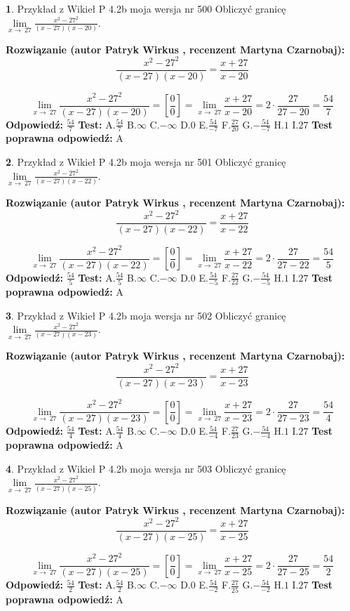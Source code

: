 \documentclass[12pt, a4paper]{article}
\theoremstyle{definition} %
\newtheorem{zad}{}
\newcommand{\zadStart}[1]{\begin{zad}#1\newline}
\newcommand{\zadStop}{\end{zad}}
\newcommand{\rozwStart}[2]{\noindent \textbf{Rozwiązanie (autor #1 , recenzent #2): }\newline}
\newcommand{\rozwStop}{\newline}
\newcommand{\odpStart}{\noindent \textbf{Odpowiedź:}\newline}
\newcommand{\odpStop}{\newline}
\newcommand{\testStart}{\noindent \textbf{Test:}\newline}
\newcommand{\testStop}{\newline}
\newcommand{\kluczStart}{\noindent \textbf{Test poprawna odpowiedź:}\newline}
\newcommand{\kluczStop}{\newline}
\begin{document}
\zadStart{Przykład z Wikieł P 4.2b moja wersja nr 500}
Obliczyć granicę $\lim\limits_{x\to\ 27}\frac{x^{2}-27^{2}}{(x-27)(x-20)}$.
\zadStop
\rozwStart{Patryk Wirkus}{Martyna Czarnobaj}
$$\frac{x^{2}-27^{2}}{(x-27)(x-20)}=\frac{x+27}{x-20}$$

$$\lim\limits_{x\to\ 27}\frac{x^{2}-27^{2}}{(x-27)(x-20)}=[\frac{0}{0}]=\lim\limits_{x\to\ 27}\frac{x+27}{x-20}=2 \cdot \frac{27}{27-20} = \frac{54}{7}$$
\rozwStop
\odpStart
$\frac{54}{7}$
\odpStop
\testStart
A.$\frac{54}{7}$
B.$\infty$
C.$-\infty$
D.$0$
E.$\frac{54}{-7}$
F.$\frac{27}{20}$
G.$-\frac{54}{-7}$
H.$1$
I.$27$
\testStop
\kluczStart
A
\kluczStop



\zadStart{Przykład z Wikieł P 4.2b moja wersja nr 501}
Obliczyć granicę $\lim\limits_{x\to\ 27}\frac{x^{2}-27^{2}}{(x-27)(x-22)}$.
\zadStop
\rozwStart{Patryk Wirkus}{Martyna Czarnobaj}
$$\frac{x^{2}-27^{2}}{(x-27)(x-22)}=\frac{x+27}{x-22}$$

$$\lim\limits_{x\to\ 27}\frac{x^{2}-27^{2}}{(x-27)(x-22)}=[\frac{0}{0}]=\lim\limits_{x\to\ 27}\frac{x+27}{x-22}=2 \cdot \frac{27}{27-22} = \frac{54}{5}$$
\rozwStop
\odpStart
$\frac{54}{5}$
\odpStop
\testStart
A.$\frac{54}{5}$
B.$\infty$
C.$-\infty$
D.$0$
E.$\frac{54}{-5}$
F.$\frac{27}{22}$
G.$-\frac{54}{-5}$
H.$1$
I.$27$
\testStop
\kluczStart
A
\kluczStop



\zadStart{Przykład z Wikieł P 4.2b moja wersja nr 502}
Obliczyć granicę $\lim\limits_{x\to\ 27}\frac{x^{2}-27^{2}}{(x-27)(x-23)}$.
\zadStop
\rozwStart{Patryk Wirkus}{Martyna Czarnobaj}
$$\frac{x^{2}-27^{2}}{(x-27)(x-23)}=\frac{x+27}{x-23}$$

$$\lim\limits_{x\to\ 27}\frac{x^{2}-27^{2}}{(x-27)(x-23)}=[\frac{0}{0}]=\lim\limits_{x\to\ 27}\frac{x+27}{x-23}=2 \cdot \frac{27}{27-23} = \frac{54}{4}$$
\rozwStop
\odpStart
$\frac{54}{4}$
\odpStop
\testStart
A.$\frac{54}{4}$
B.$\infty$
C.$-\infty$
D.$0$
E.$\frac{54}{-4}$
F.$\frac{27}{23}$
G.$-\frac{54}{-4}$
H.$1$
I.$27$
\testStop
\kluczStart
A
\kluczStop



\zadStart{Przykład z Wikieł P 4.2b moja wersja nr 503}
Obliczyć granicę $\lim\limits_{x\to\ 27}\frac{x^{2}-27^{2}}{(x-27)(x-25)}$.
\zadStop
\rozwStart{Patryk Wirkus}{Martyna Czarnobaj}
$$\frac{x^{2}-27^{2}}{(x-27)(x-25)}=\frac{x+27}{x-25}$$

$$\lim\limits_{x\to\ 27}\frac{x^{2}-27^{2}}{(x-27)(x-25)}=[\frac{0}{0}]=\lim\limits_{x\to\ 27}\frac{x+27}{x-25}=2 \cdot \frac{27}{27-25} = \frac{54}{2}$$
\rozwStop
\odpStart
$\frac{54}{2}$
\odpStop
\testStart
A.$\frac{54}{2}$
B.$\infty$
C.$-\infty$
D.$0$
E.$\frac{54}{-2}$
F.$\frac{27}{25}$
G.$-\frac{54}{-2}$
H.$1$
I.$27$
\testStop
\kluczStart
A
\kluczStop
\end{document}

